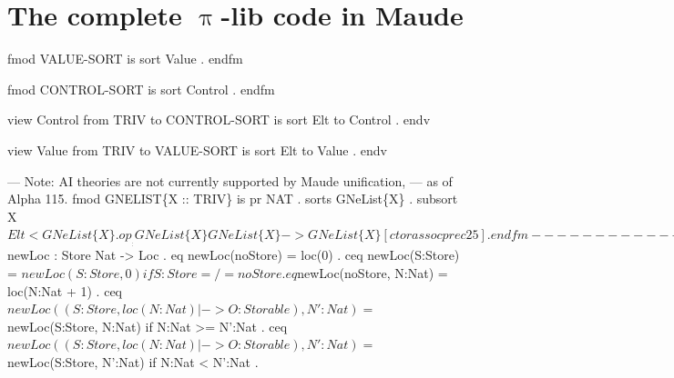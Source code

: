 \documentclass{llncs}%
\begin{document}
\section{The complete $\uppi$-lib code in Maude}

\endmoddef\nwstartdeflinemarkup\nwenddeflinemarkup
fmod VALUE-SORT is
    sort Value . 
endfm

fmod CONTROL-SORT is
    sort Control . 
endfm

view Control from TRIV to CONTROL-SORT is
    sort Elt to Control . 
endv

view Value from TRIV to VALUE-SORT is
    sort Elt to Value . 
endv

--- Note: AI theories are not currently supported by Maude unification, 
--- as of Alpha 115. 
fmod GNELIST\{X :: TRIV\} is
    pr NAT .
    sorts GNeList\{X\} .
    subsort X$Elt < GNeList\{X\} .

    op __ : GNeList\{X\} GNeList\{X\} -> GNeList\{X\} [ctor assoc prec 25] . 
endfm

--------------------------------------------------------------
--- GSMC semantics for basic programming language constructs .

fmod VALUE-STACK is
    pr GNELIST\{Value\} * (sort GNeList\{Value\} to NeValueStack) .
    sort ValueStack .
    subsort NeValueStack < ValueStack .
    op evs : -> ValueStack . 
    op __ : ValueStack ValueStack -> ValueStack [ditto] .       
endfm

fmod CONTROL-STACK is
    pr GNELIST\{Control\} * (sort GNeList\{Control\} to NeControlStack) .
    sort ControlStack .
    subsort NeControlStack < ControlStack .
    op ecs : -> ControlStack . 
    op __ : ControlStack ControlStack -> ControlStack [ditto] .         
endfm

fmod MEMORY-SORTS is
    sorts Loc Storable . 
endfm

view Loc from TRIV to MEMORY-SORTS is
    sort Elt to Loc . 
endv

view Storable from TRIV to MEMORY-SORTS is
    sort Elt to Storable . 
endv

fmod MEMORY is
    pr NAT .
    ex MAP\{Loc,Storable\} * (sort Entry\{Loc,Storable\} to Cell,
       sort Map\{Loc,Storable\} to Store,
       op undefined to undefloc, op empty to noStore).
    ex SET\{Loc\} * (op empty to noLocs) .

    op loc : Nat -> Loc [ctor] .
    op newLoc : Store -> Loc .
    op $newLoc : Store Nat -> Loc .
    eq newLoc(noStore) = loc(0) .
    ceq newLoc(S:Store) = $newLoc(S:Store, 0) if S:Store =/= noStore .
    eq $newLoc(noStore, N:Nat) = loc(N:Nat + 1) .
    ceq $newLoc((S:Store, loc(N:Nat) |-> O:Storable), N':Nat) =
        $newLoc(S:Store, N:Nat) if N:Nat >= N':Nat .
    ceq $newLoc((S:Store, loc(N:Nat) |-> O:Storable), N':Nat) =
        $newLoc(S:Store, N':Nat) if N:Nat < N':Nat .
\end{document}
